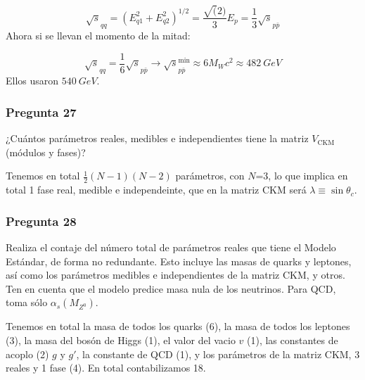 \begin{equation}
	\sqrt{s}_{{qq}} = (E_{q1}^2+E_{q2}^2)^{1/2} = \frac{\sqrt(2)}{3} E_p = \frac{1}{3} \sqrt{s}_{p\bar{p}}  
\end{equation}
Ahora si se llevan el momento de la mitad:

\begin{equation}
	\sqrt{s}_{{qq}}= \frac{1}{6} \sqrt{s}_{p\bar{p}}  \longrightarrow \sqrt{s}_{p\bar{p}}^{\min} \approx 6 M_W c^2  \approx \SI{482}{GeV}
\end{equation} 
Ellos usaron $\SI{540}{GeV}$. 

\vspace*{2em}

\begin{Enunciado}
	\subsubsection*{Pregunta 27}

	¿Cuántos parámetros reales, medibles e independientes tiene la matriz $V_{\text{CKM}}$ (módulos y fases)?

\end{Enunciado}

Tenemos en total $\frac{1}{2} (N-1)(N-2)$ parámetros, con $N$=3, lo que implica en total 1 fase real, medible e independeinte, que en la matriz CKM será $\lambda \equiv \sin \theta_c$. 

\vspace*{2em}

\begin{Enunciado}
	\subsubsection*{Pregunta 28}

	Realiza el contaje del número total de parámetros reales que tiene el Modelo Estándar, de forma no redundante. Esto incluye las masas de quarks y leptones, así como los parámetros medibles e independientes de la matriz CKM, y otros. Ten en cuenta que el modelo predice masa nula de los neutrinos. Para QCD, toma sólo $\alpha_s(M_{Z^0})$.

\end{Enunciado}

Tenemos en total la masa de todos los quarks (6), la masa de todos los leptones (3), la masa del bosón de Higgs (1), el valor del vacio $v$ (1), las constantes de acoplo (2) $g$ y $g'$, la constante de QCD (1), y los parámetros de la matriz CKM, 3 reales y 1 fase (4). En total contabilizamos 18.

